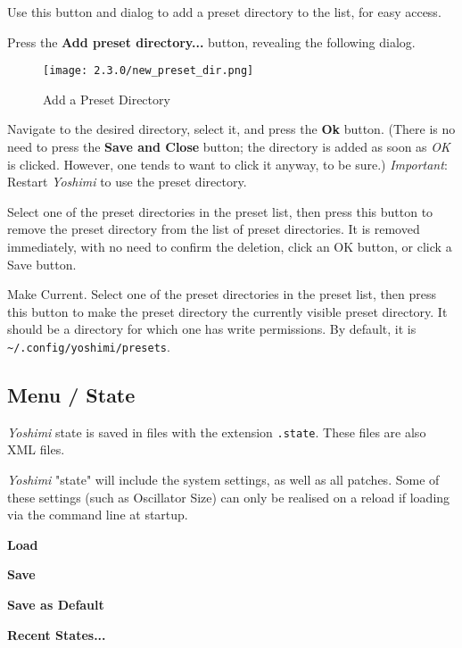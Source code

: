    Use this button and dialog to add a preset directory to the list, for
   easy access.

   Press the \textbf{Add preset directory...} button, revealing the
   following dialog.

\begin{figure}[H]
   \centering
   \texttt{[image: 2.3.0/new\_preset\_dir.png]}
   \caption[Add Preset Directory]{Add a Preset Directory}
   \label{fig:presets_add_a_preset_directory}
\end{figure}

   Navigate to the desired directory, select it, and press the \textbf{Ok}
   button.  (There is no need to press the \textbf{Save and Close} button;
   the directory is added as soon as \textsl{OK} is clicked.  However, one
   tends to want to click it anyway, to be sure.)
   \textsl{Important}:  Restart \textsl{Yoshimi} to use the preset directory.

   Select one of the preset directories in the preset list, then press this
   button to remove the preset directory from the list of preset
   directories.  It is removed immediately, with no need to confirm the
   deletion, click an OK button, or click a Save button.

   Make Current.
   Select one of the preset directories in the preset list, then press this
   button to make the preset directory the currently visible preset directory.
   It should be a directory for which one has write permissions.
   By default, it is \texttt{\textasciitilde/.config/yoshimi/presets}.

\subsection{Menu / State}
\label{subsec:menu_state}

   \textsl{Yoshimi} state is saved in files with the extension
   \texttt{.state}.  These files are also XML files.

   \textsl{Yoshimi} "state" will include the system settings, as well as all
   patches. Some of these settings (such as Oscillator Size) can only be
   realised on a reload if loading via the command line at startup.

   \begin{enumber}
      \item \textbf{Load}
      \item \textbf{Save}
      \item \textbf{Save as Default}
      \item \textbf{Recent States...}
   \end{enumber}

